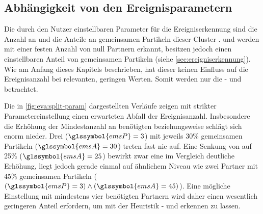 \subsection*{Abhängigkeit von den Ereignisparametern}\label{sec:eva:ereignis-param}
Die durch den Nutzer einstellbaren Parameter für die Ereigniserkennung sind die Anzahl an   und die Anteile an gemeinsamen Partikeln dieser Cluster .  und  werden mit einer festen Anzahl von null Partnern erkannt, besitzen jedoch einen einstellbaren Anteil von gemeinsamen Partikeln  (siehe \autoref{sec:ereigniserkennung}). Wie am Anfang dieses Kapitels beschrieben, hat dieser keinen Einfluss auf die Ereignisanzahl bei relevanten, geringen Werten. Somit werden nur die - und  betrachtet.

Die in \autoref{fig:eva:split-param} dargestellten Verläufe zeigen mit strikter Parametereinstellung einen erwarteten Abfall der Ereignisanzahl. Insbesondere die Erhöhung der Mindestanzahl an benötigten  beziehungsweise   schlägt sich enorm nieder. Drei  ($\glssymbol{emsP} = 3$) mit jeweils 30\% gemeinsamen Partikeln ($\glssymbol{emsA} = 30$) treten fast nie auf. Eine Senkung von  auf 25\% ($\glssymbol{emsA} = 25$) bewirkt zwar eine im Vergleich deutliche Erhöhung, liegt jedoch gerade einmal auf ähnlichem Niveau wie zwei Partner mit 45\% gemeinsamen Partikeln ($(\glssymbol{emsP} = 3) \land (\glssymbol{emsA} = 45)$). Eine mögliche Einstellung mit mindestens vier benötigten Partnern wird daher einen wesentlich geringeren Anteil erfordern, um mit der Heuristik - und  erkennen zu lassen.

